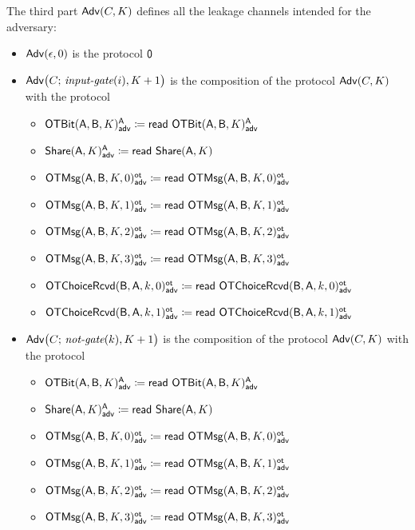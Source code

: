 \noindent The third part $\Adv(C,K)$ defines all the leakage channels intended for the adversary:

\begin{itemize}
\item $\Adv(\epsilon,0)$ is the protocol $\zero$
\item $\Adv\big(C; \, \inputgate(i),K+1\big)$ is the composition of the protocol $\Adv(C,K)$ with the protocol
\begin{itemize}
\item {\color{blue} $\LeakOTBit(\A,\B,K)^\A_\adv \coloneqq \read{\LeakOTBit(\A,\B,K)^\A_\adv}$}
\item {\color{blue} $\LeakShare(\A,K)^\A_\adv \coloneqq \read{\Share(\A,K)}$}\medskip
\item {\color{blue} $\LeakOTMsg(\A,\B,K,0)^\ot_\adv \coloneqq \read{\LeakOTMsg(\A,\B,K,0)^\ot_\adv}$}
\item {\color{blue} $\LeakOTMsg(\A,\B,K,1)^\ot_\adv \coloneqq \read{\LeakOTMsg(\A,\B,K,1)^\ot_\adv}$}
\item {\color{blue} $\LeakOTMsg(\A,\B,K,2)^\ot_\adv \coloneqq \read{\LeakOTMsg(\A,\B,K,2)^\ot_\adv}$}
\item {\color{blue} $\LeakOTMsg(\A,\B,K,3)^\ot_\adv \coloneqq \read{\LeakOTMsg(\A,\B,K,3)^\ot_\adv}$}\medskip
\item {\color{blue} $\LeakOTChoiceRcvd(\B,\A,k,0)^\ot_\adv \coloneqq \read{\LeakOTChoiceRcvd(\B,\A,k,0)^\ot_\adv}$}
\item {\color{blue} $\LeakOTChoiceRcvd(\B,\A,k,1)^\ot_\adv \coloneqq \read{\LeakOTChoiceRcvd(\B,\A,k,1)^\ot_\adv}$}
\end{itemize}
\item $\Adv\big(C; \, \notgate(k),K+1\big)$ is the composition of the protocol $\Adv(C,K)$ with the protocol
\begin{itemize}
\item {\color{blue} $\LeakOTBit(\A,\B,K)^\A_\adv \coloneqq \read{\LeakOTBit(\A,\B,K)^\A_\adv}$}
\item {\color{blue} $\LeakShare(\A,K)^\A_\adv \coloneqq \read{\Share(\A,K)}$}\medskip
\item {\color{blue} $\LeakOTMsg(\A,\B,K,0)^\ot_\adv \coloneqq \read{\LeakOTMsg(\A,\B,K,0)^\ot_\adv}$}
\item {\color{blue} $\LeakOTMsg(\A,\B,K,1)^\ot_\adv \coloneqq \read{\LeakOTMsg(\A,\B,K,1)^\ot_\adv}$}
\item {\color{blue} $\LeakOTMsg(\A,\B,K,2)^\ot_\adv \coloneqq \read{\LeakOTMsg(\A,\B,K,2)^\ot_\adv}$}
\item {\color{blue} $\LeakOTMsg(\A,\B,K,3)^\ot_\adv \coloneqq \read{\LeakOTMsg(\A,\B,K,3)^\ot_\adv}$}\medskip

\end{itemize}
\end{itemize}
